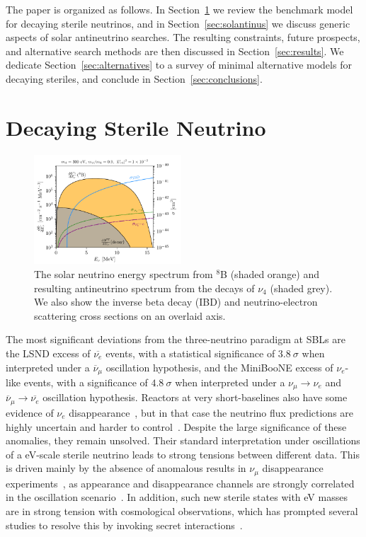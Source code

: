 \documentclass[
reprint,
superscriptaddress,
showpacs,
preprintnumbers,
nofootinbib,
nobibnotes,
amsmath,
amssymb, 
aps,
prd,
floatfix
]{revtex4-1}
\newcommand{\refsec}[1]{Section~\ref{#1}}
\begin{document}
The paper is organized as follows. In \refsec{sec:model} we review the benchmark model for decaying sterile neutrinos, and in \refsec{sec:solantinus} we discuss generic aspects of solar antineutrino searches. The resulting constraints, future prospects, and alternative search methods are then discussed in \refsec{sec:results}. We dedicate \refsec{sec:alternatives} to a survey of minimal alternative models for decaying steriles, and conclude in \refsec{sec:conclusions}.

\section{Decaying Sterile Neutrino}\label{sec:model}
%
\begin{figure}[t]
    \centering
    \includegraphics[width=0.49\textwidth]{Spectrum_scalar_300_MB_270.pdf}
    \caption{The solar neutrino energy spectrum from $^8$B (shaded orange) and resulting antineutrino spectrum from the decays of $\nu_4$ (shaded grey). We also show the inverse beta decay (IBD) and neutrino-electron scattering cross sections on an overlaid axis. \label{fig:B8flux}}
\end{figure}
%

The most significant deviations from the three-neutrino paradigm at SBLs are the LSND excess of $\overline{\nu_e}$ events, with a statistical significance of $3.8~\sigma$ when interpreted under a $\overline{\nu}_\mu$ oscillation hypothesis, and the MiniBooNE excess of $\nu_e$-like events, with a significance of $4.8~\sigma$ when interpreted under a ${\nu}_\mu\to {\nu_e}$ and $\overline{\nu}_\mu\to \overline{\nu_e}$ oscillation hypothesis. Reactors at very short-baselines also have some evidence of $\nu_e$ disappearance~\cite{Mention:2011rk,Dentler:2017tkw}, but in that case the neutrino flux predictions are highly uncertain and harder to control~\cite{Berryman:2019hme,Berryman:2020agd}. Despite the large significance of these anomalies, they remain unsolved. Their standard interpretation under oscillations of a eV-scale sterile neutrino leads to strong tensions between different data. This is driven mainly by the absence of anomalous results in $\nu_\mu$ disappearance experiments~\cite{Dentler:2018sju,Diaz:2019fwt}, as appearance and disappearance channels are strongly correlated in the oscillation scenario~\cite{Okada:1996kw,Bilenky:1996rw}. In addition, such new sterile states with eV masses are in strong tension with cosmological observations, which has prompted several studies to resolve this by invoking secret interactions~\cite{Dasgupta:2013zpn,Hannestad:2013ana,Vecchi:2016lty,Farzan:2019yvo,Cline:2019seo}.  
\end{document}
